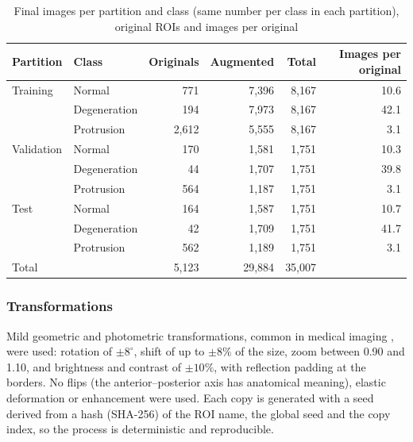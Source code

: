 \begin{table}[t]
\centering\footnotesize
\caption{Final images per partition and class (same number per class in each partition), original ROIs and images per original}
\label{tab:35k}
\begin{tabular}{llrrrr}
\toprule
Partition & Class & Originals & Augmented & Total & Images per original \\
\midrule
Training   & Normal       & 771   & 7,396 & 8,167 & 10.6 \\
           & Degeneration & 194   & 7,973 & 8,167 & 42.1 \\
           & Protrusion   & 2,612 & 5,555 & 8,167 & 3.1  \\
Validation & Normal       & 170   & 1,581 & 1,751 & 10.3 \\
           & Degeneration & 44    & 1,707 & 1,751 & 39.8 \\
           & Protrusion   & 564   & 1,187 & 1,751 & 3.1  \\
Test       & Normal       & 164   & 1,587 & 1,751 & 10.7 \\
           & Degeneration & 42    & 1,709 & 1,751 & 41.7 \\
           & Protrusion   & 562   & 1,189 & 1,751 & 3.1  \\
\midrule
Total      &              & 5,123 & 29,884 & 35,007 & \\
\bottomrule
\end{tabular}
\end{table}

\subsubsection{Transformations}
Mild geometric and photometric transformations, common in medical imaging \cite{islam2024}, were used: rotation of $\pm 8^{\circ}$, shift of up to $\pm 8\%$ of the size, zoom between 0.90 and 1.10, and brightness and contrast of $\pm 10\%$, with reflection padding at the borders. No flips (the anterior--posterior axis has anatomical meaning), elastic deformation or enhancement were used. Each copy is generated with a seed derived from a hash (SHA-256) of the ROI name, the global seed and the copy index, so the process is deterministic and reproducible.

